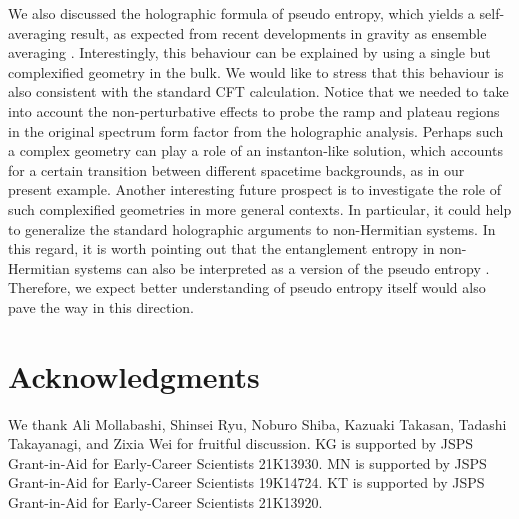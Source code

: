 \documentclass[%
twocolumn, 
secnumarabic,amssymb, preprintnumbers, superscriptaddress, aps, prl]{revtex4-1}
\begin{document}

We also discussed the holographic formula of pseudo entropy, which yields a self-averaging result, as expected from recent developments in gravity as ensemble averaging \cite{2017JHEP...05..118C,Saad:2018bqo,Saad:2019lba,Penington:2019kki}. Interestingly, this behaviour can be explained by using a single but complexified geometry in the bulk. We would like to stress that this behaviour is also consistent with the standard CFT calculation. Notice that we needed to take into account the non-perturbative effects to probe the ramp and plateau regions in the original spectrum form factor from the holographic analysis. Perhaps such a complex geometry can play a role of an instanton-like solution, which accounts for a certain transition between different spacetime backgrounds, as in our present example. Another interesting future prospect is to investigate the role of such complexified geometries in more general contexts. In particular, it could help to generalize the standard holographic arguments to non-Hermitian systems. In this regard,  it is worth pointing out that the entanglement entropy in non-Hermitian systems can  also be interpreted as a version of the pseudo entropy \cite{Chang:2019jcj}. Therefore, we expect better understanding of pseudo entropy itself would also pave the way in this direction. 


\section*{Acknowledgments}
We thank Ali Mollabashi, Shinsei Ryu, Noburo Shiba, Kazuaki Takasan, Tadashi Takayanagi, and Zixia Wei for fruitful discussion. KG is supported by JSPS Grant-in-Aid for Early-Career Scientists 21K13930. MN is supported by JSPS Grant-in-Aid for Early-Career Scientists 19K14724. KT is supported by JSPS Grant-in-Aid for Early-Career Scientists 21K13920.


%
%

\end{document}
